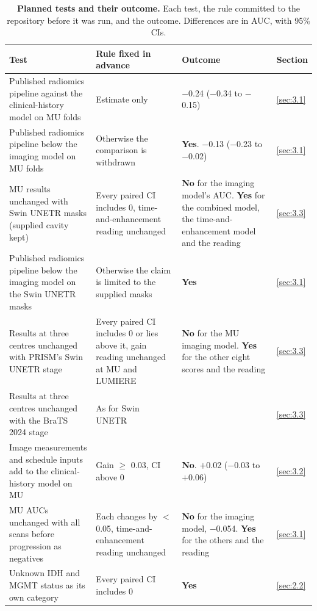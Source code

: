 \begin{table}[!htbp]
\centering
\caption[Planned tests]{\textbf{Planned tests and their outcome.} Each test, the rule committed to the repository
before it was run, and the outcome. Differences are in AUC, with 95\% CIs.}
\label{tab:2}
\begin{threeparttable}
\footnotesize
\zebrarows
\begin{tabularx}{\linewidth}{@{}R{4.0cm}R{3.9cm}LR{0.9cm}@{}}
\toprule
Test & Rule fixed in advance & Outcome & Section \\
\midrule
Published radiomics pipeline against the clinical-history model on MU folds & Estimate only & $-$0.24 ($-$0.34 to $-$0.15) & \ref{sec:3.1} \\
Published radiomics pipeline below the imaging model on MU folds & Otherwise the comparison is withdrawn & \textbf{Yes}. $-$0.13 ($-$0.23 to $-$0.02) & \ref{sec:3.1} \\
MU results unchanged with Swin UNETR masks (supplied cavity kept) & Every paired CI includes 0, time-and-enhancement reading unchanged & \textbf{No} for the imaging model's AUC. \textbf{Yes} for the combined model, the time-and-enhancement model and the reading & \ref{sec:3.3} \\
Published radiomics pipeline below the imaging model on the Swin UNETR masks & Otherwise the claim is limited to the supplied masks & \textbf{Yes} & \ref{sec:3.1} \\
Results at three centres unchanged with PRISM's Swin UNETR stage & Every paired CI includes 0 or lies above it, gain reading unchanged at MU and LUMIERE & \textbf{No} for the MU imaging model. \textbf{Yes} for the other eight scores and the reading & \ref{sec:3.3} \\
Results at three centres unchanged with the BraTS 2024 stage & As for Swin UNETR &  & \ref{sec:3.3} \\
Image measurements and schedule inputs add to the clinical-history model on MU & Gain $\geq$ 0.03, CI above 0 & \textbf{No}. $+$0.02 ($-$0.03 to $+$0.06) & \ref{sec:3.2} \\
MU AUCs unchanged with all scans before progression as negatives & Each changes by $<$ 0.05, time-and-enhancement reading unchanged & \textbf{No} for the imaging model, $-$0.054. \textbf{Yes} for the others and the reading & \ref{sec:3.1} \\
Unknown IDH and MGMT status as its own category & Every paired CI includes 0 & \textbf{Yes} & \ref{sec:2.2} \\

\end{tabularx}
\end{threeparttable}
\end{table}
